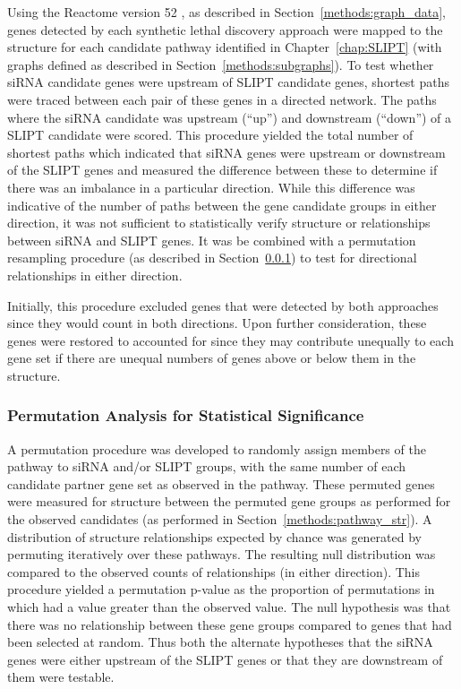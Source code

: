 Using the Reactome version 52 \citep{Reactome}, as described in Section~\ref{methods:graph_data}, genes detected by each \gls{synthetic lethal} discovery approach were mapped to the  structure for each candidate pathway identified in Chapter~\ref{chap:SLIPT} (with graphs defined as described in Section~\ref{methods:subgraphs}). To test whether \gls{siRNA} candidate genes were upstream of \gls{SLIPT} candidate genes, \glspl{shortest path} were traced between each pair of these genes in a directed network. The paths where the \gls{siRNA} candidate was upstream (``up'') and downstream (``down'') of a \gls{SLIPT} candidate were scored.  This procedure yielded the total number of \glspl{shortest path} which indicated that \gls{siRNA} genes were upstream or downstream of the \gls{SLIPT} genes and measured the difference between these to determine if there was an imbalance in a particular direction. While this difference was indicative of the number of paths between the gene candidate groups in either direction, it was not sufficient to statistically verify structure or relationships between \gls{siRNA} and \gls{SLIPT} genes. It was be combined with a permutation resampling procedure (as described in Section~\ref{methods:network_permutation}) to test for directional relationships in either direction.

Initially, this procedure excluded genes that were detected by both approaches since they would count in both directions. Upon further consideration, these genes were restored to accounted for since they may contribute unequally to each gene set if there are unequal numbers of genes above or below them in the  structure.

\subsubsection{Permutation Analysis for Statistical Significance} \label{methods:network_permutation}
A permutation procedure was developed to randomly assign members of the pathway to \gls{siRNA} and/or \gls{SLIPT} groups, with the same number of each candidate partner gene set as observed in the pathway. These permuted genes were measured for  structure between the permuted gene groups as performed for the observed candidates (as performed in Section~\ref{methods:pathway_str}). A distribution of  structure relationships expected by chance was generated by permuting iteratively over these pathways. The resulting null distribution was compared to the observed counts of relationships (in either direction). This procedure yielded a permutation p-value as the proportion of permutations in which had a value greater than the observed value. The null hypothesis was that there was no relationship between these gene groups compared to genes that had been selected at random. Thus both the alternate hypotheses that the \gls{siRNA} genes were either upstream of the \gls{SLIPT} genes or that they are downstream of them were testable.

